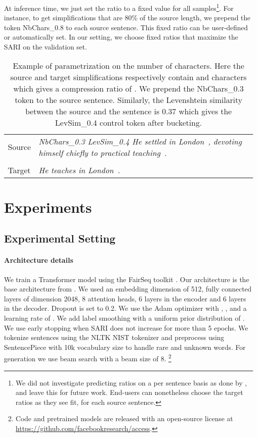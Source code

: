 \documentclass[10pt, a4paper]{article}
\begin{document}
At inference time, we just set the ratio to a fixed value for all samples\footnote{We did not investigate predicting ratios on a per sentence basis as done by , and leave this for future work. End-users can nonetheless choose the target ratios as they see fit, for each source sentence.}. For instance, to get simplifications that are 80\% of the source length, we prepend the token NbChars\_0.8 to each source sentence.
This fixed ratio can be user-defined or automatically set.
In our setting, we choose fixed ratios that maximize the SARI on the validation set.


\begin{table}
\small
\centering
\begin{tabular}{p{}p{}}
\toprule
Source& \textit{NbChars\_0.3 LevSim\_0.4  He settled in London~, devoting himself chiefly to practical teaching~.}\\
& \\
Target & \textit{He teaches in London~.}\\
\bottomrule
\end{tabular}
\caption{Example of parametrization on the number of characters. Here the source and target simplifications respectively contain  and  characters which gives a compression ratio of . We prepend the NbChars\_0.3 token to the source sentence. Similarly, the Levenshtein similarity between the source and the sentence is 0.37 which gives the LevSim\_0.4 control token after bucketing.}
\label{conditioning_example}
\end{table}


\section{Experiments}

\subsection{Experimental Setting}

\paragraph{Architecture details}
We train a Transformer model \cite{vaswani2017attention} using the FairSeq toolkit \cite{ott2019fairseq}.
Our architecture is the base architecture from \cite{vaswani2017attention}. We used an embedding dimension of 512, fully connected layers of dimension 2048, 8 attention heads, 6 layers in the encoder and 6 layers in the decoder. Dropout is set to 0.2. We use the Adam optimizer \cite{kingma2014adam} with , ,  and a learning rate of . We add label smoothing with a uniform prior distribution of . We use early stopping when SARI does not increase for more than 5 epochs. We tokenize sentences using the NLTK NIST tokenizer and preprocess using SentencePiece \cite{kudo2018sentencepiece} with 10k vocabulary size to handle rare and unknown words. For generation we use beam search with a beam size of 8.
\footnote{Code and pretrained models are released with an open-source license at \mbox{\url{https://github.com/facebookresearch/access}}.}
\end{document}
